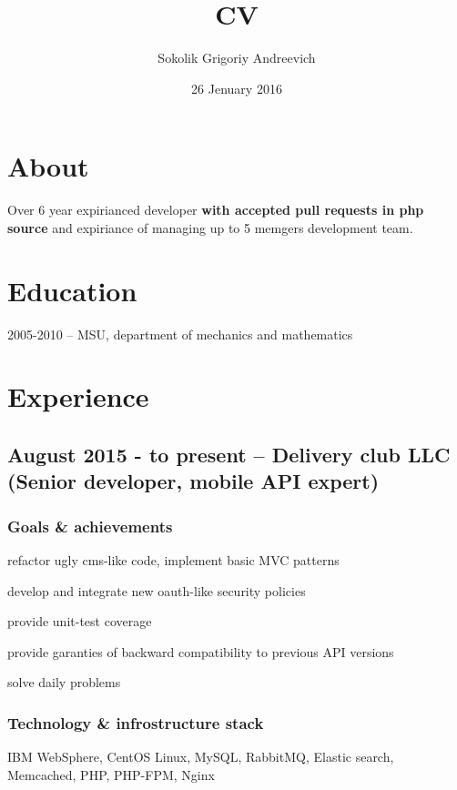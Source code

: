 \documentclass[9pt, a4paper, english]{extarticle}
\title {CV}
\author{Sokolik Grigoriy Andreevich}
\date {26 Jenuary 2016}
\begin{document}
\maketitle

\section* {About}
Over 6 year expirianced developer \textbf{with accepted pull requests in php source} and expiriance of managing up to 5 memgers development team.

\section* {Education}
2005-2010 -- MSU, department of mechanics and mathematics


\section* {Experience}
  \subsection* {August 2015 - to present -- \textbf{Delivery club LLC} (Senior developer, mobile API expert)}
    \subsubsection* {Goals \& achievements}
      \begin {list}{\textbullet}{\itemsep=0mm}
        \item refactor ugly cms-like code, implement basic MVC patterns
        \item develop and integrate new oauth-like security policies
        \item provide unit-test coverage
        \item provide garanties of backward compatibility to previous API versions
        \item solve daily problems
      \end{list}
    \subsubsection* {Technology \& infrostructure stack}
      IBM WebSphere, CentOS Linux, MySQL, RabbitMQ, Elastic search, Memcached,
      PHP, PHP-FPM, Nginx
\end{document}
